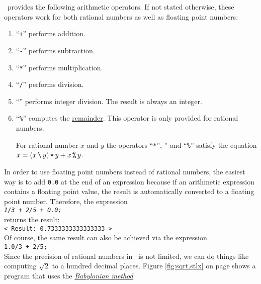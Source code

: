\setlx\ provides the following arithmetic operators.  If not stated otherwise, these operators work
for both rational numbers as well as floating point numbers:
\begin{enumerate}
\item ``\texttt{+}'' performs addition.
\item ``\texttt{-}'' performs subtraction.
\item ``\texttt{*}'' performs multiplication.
\item ``\texttt{/}'' performs division.
\item ``\texttt{}'' performs integer division.
      The result is always an integer.
\item ``\texttt{\%}'' computes the \href{https://en.wikipedia.org/wiki/Remainder}{remainder}.  
      This operator is only provided for rational numbers.

      For rational number $x$ and $y$ the operators ``\texttt{*}'', \texttt{}'' and ``\texttt{\%}'' 
      satisfy the equation
      \\[0.2cm]
      \hspace*{1.3cm}
      $x = (x \,\texttt{\symbol{92}}\, y) \,\texttt{*}\, y + x\,\texttt{\%}\, y$.
\end{enumerate}
In order to use floating point numbers instead of rational numbers, the easiest way is to add
\texttt{0.0} at the end of an expression because if an arithmetic expression 
contains a floating point value, the result is automatically converted to a floating point number.
Therefore, the expression
\\[0.2cm]
\hspace*{1.3cm}
\texttt{\textsl{1/3 + 2/5 + 0.0;}}
\\[0.2cm]
returns the result:
\\[0.2cm]
\hspace*{1.3cm}
\texttt{< Result: 0.7333333333333333 >}
\\[0.2cm]
Of course, the same result can also be achieved via the expression
\\[0.2cm]
\hspace*{1.3cm}
\texttt{1.0/3 + 2/5;}
\\[0.2cm]
Since the precision of rational numbers in \setlx\ is not limited, we can do things like computing
$\sqrt{2}$ to a hundred decimal places.  Figure \ref{fig:sqrt.stlx} on page \pageref{fig:sqrt.stlx}
shows a program that uses the 
\href{http://en.wikipedia.org/wiki/Methods_of_computing_square_roots#Babylonian_method}{\emph{Babylonian method}}
